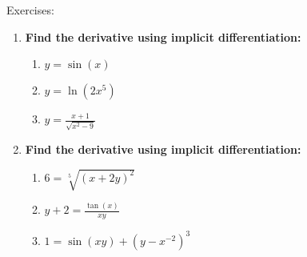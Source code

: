 \documentclass[../revisedMain.tex]{subfiles}
\begin{document}
	\newpage
	\begin{center}
		{\Large Exercises:}
	\end{center}
	\begin{enumerate}
		\item\textbf{Find the derivative using implicit differentiation:}
		\begin{enumerate}
			\item $y=\sin(x)$
			\item $y=\ln(2x^5)$
			\item $y=\displaystyle\frac{x+1}{\sqrt{x^2-9}}$
		\end{enumerate}
		\item\textbf{Find the derivative using implicit differentiation:}
		\begin{enumerate}
			\item $6=\sqrt[5]{(x+2y)^2}$
			\item $y+2=\displaystyle\frac{\tan(x)}{xy}$
			\item $1=\sin(xy)+(y-x^{-2})^3$
		\end{enumerate}
	\end{enumerate}
\end{document}
